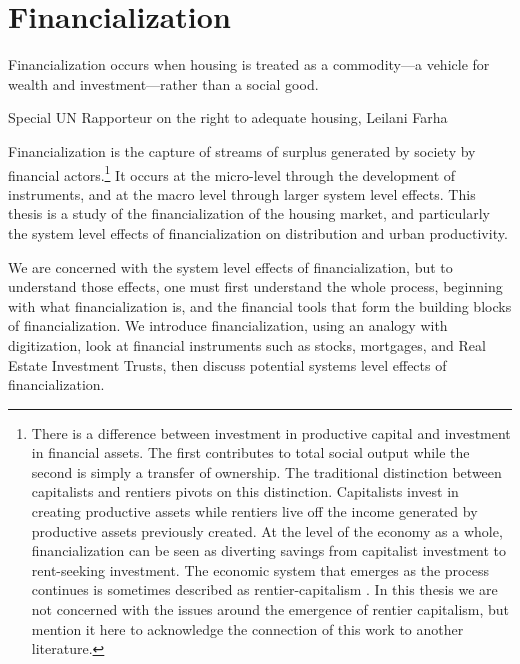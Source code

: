 \chapter{Financialization} \label{chapter-financialization}
\epigraph{Financialization occurs when housing is treated as a commodity---a vehicle for wealth and investment---rather than a social good.}{Special UN Rapporteur on the right to adequate housing, Leilani Farha \cite{farhaReportFinancializationHousing2017}}

Financialization is the capture of streams of surplus generated by society by financial actors.\footnote{There is a difference between investment in productive capital and investment in financial assets. The first contributes to total social output while the second is simply a transfer of ownership. The traditional distinction between capitalists and \glspl{rentier} pivots on this distinction. Capitalists invest in creating productive assets while rentiers live off the income generated by productive assets previously created. At the level of the economy as a whole, financialization can be seen as diverting savings from capitalist investment to rent-seeking investment. The economic system  that emerges as the process continues is sometimes described as rentier-capitalism \cite{christophersClassAssetsWork2021,  standingCorruptionCapitalismWhy2017}. In this thesis we are not concerned with the issues around the emergence of rentier capitalism, but mention it here to acknowledge the connection of this work to another literature.} It occurs at the micro-level through the development of instruments, and at the macro level through larger system level effects. This thesis is a study of the financialization of the housing market, and particularly the system level effects of financialization on distribution and urban productivity. 

We are concerned with the system level effects of financialization, but to understand those effects, one must first understand the whole process, beginning with what financialization is, and the financial tools that form the building blocks of financialization. 
We introduce financialization, using an analogy with digitization, look at financial instruments such as stocks, mortgages, and Real Estate Investment Trusts, then discuss potential systems level effects of financialization.


